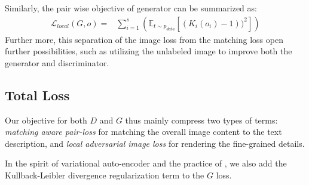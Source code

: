 \documentclass[10pt,twocolumn,letterpaper]{article}
\begin{document}
Similarly, the pair wise objective of generator can be summarized as:
\begin{equation}
\label{equ:pariG}
\begin{split}
\mathcal{L}_{local}(G, o)  = & \sum_{i=1}^{s} ( \mathbb{E}_{t \sim p_{data}}[ (K_i( {o}_i) - 1) )^2 ] )
\end{split}
\end{equation}
Further more, this separation of the image loss from the matching loss open further possibilities, such as utilizing the unlabeled image to improve both the generator and discriminator.



\subsection{Total Loss}

Our objective for both $D$ and $G$ thus mainly compress two types of terms: \textit{matching aware pair-loss} for matching the overall image content to the text description, and \textit{local adversarial image loss} for rendering the fine-grained details.

In the spirit of variational auto-encoder and the practice of \cite{han2017stackgan}, we also add the  Kullback-Leibler divergence regularization term to the $G$ loss.  %
\end{document}
